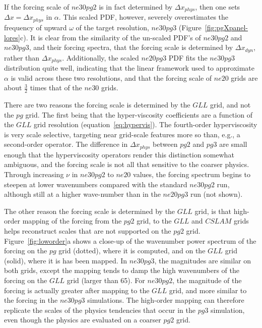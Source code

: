 \documentclass{agujournal}
\begin{document}
If the forcing scale of $ne30pg2$ is in fact determined by $\Delta x_{phys}$, then one sets $\Delta x = \Delta x_{phys}$ in $\alpha$. This scaled PDF, however, severely overestimates the frequency of upward $\omega$ of the target resolution, $ne30pg3$ (Figure~\ref{fig:pgXpanel-lores}c). It is clear from the similarity of the un-scaled PDF's of $ne30pg2$ and $ne30pg3$, and their forcing spectra, that the forcing scale is determined by $\Delta x_{dyn}$, rather than $\Delta x_{phys}$. Additionally, the scaled $ne20pg3$ PDF fits the $ne30pg3$ distribution quite well, indicating that the linear framework used to approximate $\alpha$ is valid across these two resolutions, and that the forcing scale of $ne20$ grids are about $\frac{3}{2}$ times that of the $ne30$ grids.

There are two reasons the forcing scale is determined by the $GLL$ grid, and not the $pg$ grid. The first being that the hyper-viscosity coefficients are a function of the $GLL$ grid resolution (equation~\ref{eq:hypervis}). The fourth-order hyperviscosity is very scale selective, targeting near grid-scale features more so than, e.g., a second-order operator. The difference in $\Delta x_{phys}$ between $pg2$ and $pg3$ are small enough that the hyperviscosity operators render this distinction somewhat ambiguous, and the forcing scale is not all that sensitive to the coarser physics. Through increasing $\nu$ in $ne30pg2$ to $ne20$ values, the forcing spectrum begins to steepen at lower wavenumbers compared with the standard $ne30pg2$ run, although still at a higher wave-number than in the $ne20pg3$ run (not shown).

The other reason the forcing scale is determined by the $GLL$ grid, is that high-order mapping of the forcing from the $pg2$ grid, to the $GLL$ and $CSLAM$ grids helps reconstruct scales that are not supported on the $pg2$ grid. Figure~\ref{fig:loworder}a shows a close-up of the wavenumber power spectrum of the forcing on the $pg$ grid (dotted), where it is computed, and on the $GLL$ grid (solid), where it is has been mapped. In $ne30pg3$, the magnitudes are similar on both grids, except the mapping tends to damp the high wavenumbers of the forcing on the $GLL$ grid (larger than 65). For $ne30pg2$, the magnitude of the forcing is actually greater after mapping to the $GLL$ grid, and more similar to the forcing in the $ne30pg3$ simulations. The high-order mapping can therefore replicate the scales of the physics tendencies that occur in the $pg3$ simulation, even though the physics are evaluated on a coarser $pg2$ grid.
\end{document}
